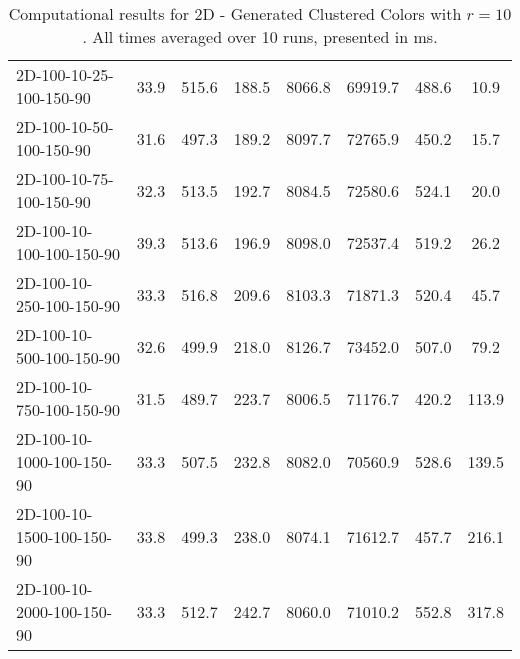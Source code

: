 \documentclass{article}
\begin{document}
\begin{table}[h]
\begin{center}
\begin{tabular}{|l||c|c|c|c|c|c|c|}
            \hline
            2D-100-10-25-100-150-90        & 33.9 & 515.6     & 188.5      & 8066.8      & 69919.7  & 488.6     & 10.9       \\
            2D-100-10-50-100-150-90        & 31.6 & 497.3     & 189.2      & 8097.7      & 72765.9  & 450.2     & 15.7       \\
            2D-100-10-75-100-150-90        & 32.3 & 513.5     & 192.7      & 8084.5      & 72580.6  & 524.1     & 20.0       \\
            2D-100-10-100-100-150-90       & 39.3 & 513.6     & 196.9      & 8098.0      & 72537.4  & 519.2     & 26.2       \\
            2D-100-10-250-100-150-90       & 33.3 & 516.8     & 209.6      & 8103.3      & 71871.3  & 520.4     & 45.7       \\
            2D-100-10-500-100-150-90       & 32.6 & 499.9     & 218.0      & 8126.7      & 73452.0  & 507.0     & 79.2       \\
            2D-100-10-750-100-150-90       & 31.5 & 489.7     & 223.7      & 8006.5      & 71176.7  & 420.2     & 113.9      \\
            2D-100-10-1000-100-150-90      & 33.3 & 507.5     & 232.8      & 8082.0      & 70560.9  & 528.6     & 139.5      \\
            2D-100-10-1500-100-150-90      & 33.8 & 499.3     & 238.0      & 8074.1      & 71612.7  & 457.7     & 216.1      \\
            2D-100-10-2000-100-150-90      & 33.3 & 512.7     & 242.7      & 8060.0      & 71010.2  & 552.8     & 317.8      \\
            \hline
        \end{tabular}
        \caption{Computational results for 2D - Generated Clustered Colors with $r=10$. All times averaged over 10 runs, presented in ms.}
    \end{center}
    \end{table}
\end{document}
